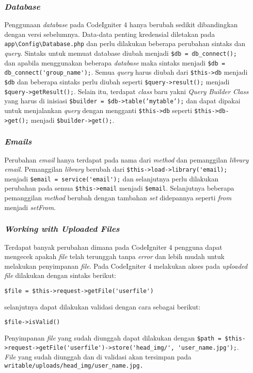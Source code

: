 \subsubsection{\textit{Database}}

Penggunaan \textit{database} pada CodeIgniter 4 hanya berubah sedikit dibandingkan dengan versi sebelumnya. Data-data penting kredensial diletakan pada \verb|app\Config\Database.php| dan perlu dilakukan beberapa perubahan sintaks dan \textit{query}. Sintaks untuk memuat database diubah menjadi \verb|$db = db_connect();| dan  apabila menggunakan beberapa \textit{database} maka sintaks menjadi \verb|$db = db_connect('group_name');|. Semua \textit{query} harus diubah dari \verb|$this->db| menjadi \verb|$db| dan beberapa sintaks perlu diubah seperti \verb|$query->result();| menjadi \verb|$query->getResult();|. Selain itu, terdapat \textit{class} baru yakni \textit{Query Builder Class} yang harus di inisiasi \texttt{\$builder = \$db->table('mytable');} dan dapat dipakai untuk menjalankan \textit{query} dengan mengganti \verb|$this->db| seperti \verb|$this->db->get();| menjadi \verb|$builder->get();|.

\subsubsection{\textit{Emails}}

Perubahan \textit{email} hanya terdapat pada nama dari \textit{method} dan pemanggilan \textit{library email}. Pemanggilan  \textit{library} berubah dari \verb|$this->load->library('email);| menjadi \verb|$email = service('email');| dan selanjutnya perlu dilakukan perubahan pada semua \verb|$this->email| menjadi \verb|$email|. Selanjutnya beberapa pemanggilan \textit{method} berubah dengan tambahan \textit{set} didepannya seperti \textit{from} menjadi \textit{setFrom}.

\subsubsection{\textit{Working with Uploaded Files}}

Terdapat banyak perubahan dimana pada CodeIgniter 4 pengguna dapat mengecek apakah \textit{file} telah terunggah tanpa \textit{error} dan lebih mudah untuk melakukan penyimpanan \textit{file}. Pada CodeIgniter 4 melakukan akses pada \textit{uploaded file} dilakukan dengan sintaks berikut:
\begin{center}
\verb|$file = $this->request->getFile('userfile')|
\end{center} selanjutnya dapat dilakukan validasi dengan cara sebagai berikut:
\begin{center}
\verb|$file->isValid()|
\end{center} 
Penyimpanan \textit{file} yang sudah diunggah dapat dilakukan dengan \verb|$path = $this->request->getFile('userfile')->store('head_img/', 'user_name.jpg');|. \textit{File} yang sudah diunggah dan di validasi akan tersimpan pada \verb|writable/uploads/head_img/user_name.jpg.|


